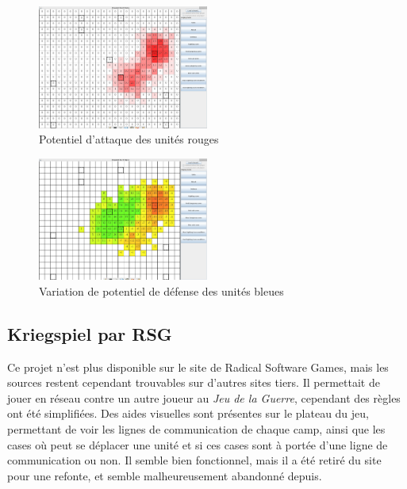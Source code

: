 \documentclass[a4paper]{report}
\begin{document}
\begin{figure}[h]
\caption{Potentiel d'attaque des unités rouges}
\centering
\includegraphics[width=0.5\textwidth]{pdp20142}
\end{figure}

\begin{figure}[!h]
\caption{Variation de potentiel de défense des unités bleues}
\centering
\includegraphics[width=0.5\textwidth]{pdp20143}
\end{figure}


\subsection*{Kriegspiel par RSG\cite{rsg}}
Ce projet n'est plus disponible sur le site de Radical Software Games, mais les sources restent cependant trouvables sur d'autres sites tiers. Il permettait de jouer en réseau contre un autre joueur au \textit{Jeu de la Guerre}, cependant des règles ont été simplifiées. Des aides visuelles sont présentes sur le plateau du jeu, permettant de voir les lignes de communication de chaque camp, ainsi que les cases où peut se déplacer une unité et si ces cases sont à portée d'une ligne de communication ou non. Il semble bien fonctionnel, mais il a été retiré du site pour une refonte, et semble malheureusement abandonné depuis.
\end{document}
